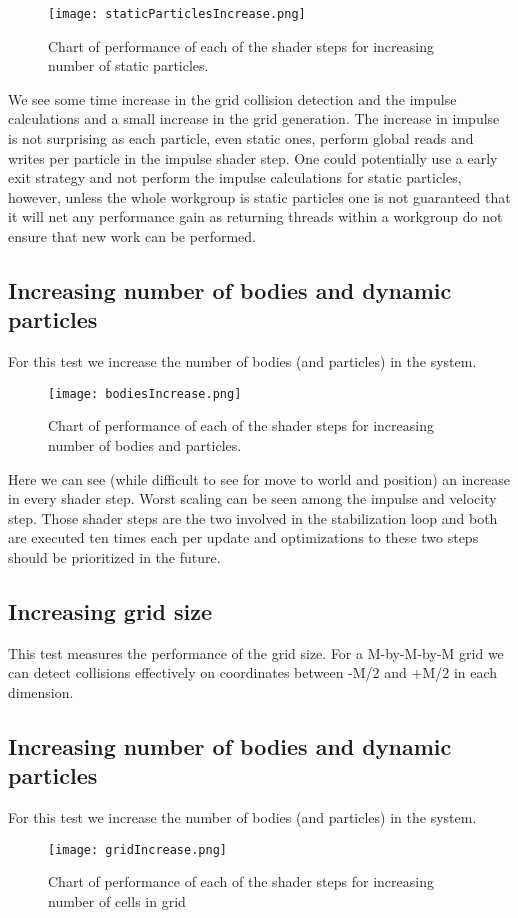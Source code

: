 \begin{figure}[H]
  \centering
  \texttt{[image: staticParticlesIncrease.png]}
  \caption{Chart of performance of each of the shader steps for increasing number of static particles.}
\end{figure}

We see some time increase in the grid collision detection and the impulse calculations
and a small increase in the grid generation.
The increase in impulse is not surprising as each particle, even static ones, perform
global reads and writes per particle in the impulse shader step. One could potentially
use a early exit strategy and not perform the impulse calculations for static particles,
however, unless the whole workgroup is static particles one is not guaranteed that
it will net any performance gain as returning threads within a workgroup do not ensure
that new work can be performed.

\subsection{Increasing number of bodies and dynamic particles}
For this test we increase the number of bodies (and particles) in the system.
\begin{figure}[H]
  \centering
  \texttt{[image: bodiesIncrease.png]}
  \caption{Chart of performance of each of the shader steps for increasing number of bodies and particles.}
\end{figure}

Here we can see (while difficult to see for move to world and position) an increase in every shader step.
Worst scaling can be seen among the impulse and velocity step. Those shader steps are the two involved
in the stabilization loop and both are executed ten times each per update and optimizations
to these two steps should be prioritized in the future.

\subsection{Increasing grid size}
This test measures the performance of the grid size. For a M-by-M-by-M grid we can detect collisions
effectively on coordinates between -M/2 and +M/2 in each dimension.
\subsection{Increasing number of bodies and dynamic particles}
For this test we increase the number of bodies (and particles) in the system.
\begin{figure}[H]
  \centering
  \texttt{[image: gridIncrease.png]}
  \caption{Chart of performance of each of the shader steps for increasing number of cells in grid}
\end{figure}

